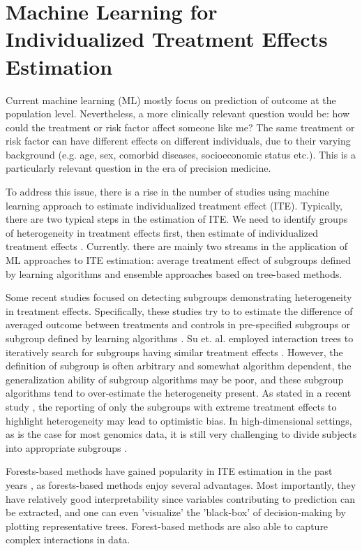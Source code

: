   \section{Machine Learning for Individualized Treatment Effects Estimation}
    Current machine learning (ML) mostly focus on prediction of outcome at the population level. Nevertheless, a more clinically relevant question would be: how could the treatment or risk factor affect someone like me? The same treatment or risk factor can have different effects on different individuals, due to their varying background (e.g. age, sex, comorbid diseases, socioeconomic status etc.). This is a particularly relevant question in the era of precision medicine. 
   
    To address this issue, there is  a rise in the number of studies using machine learning approach to estimate individualized treatment effect (ITE). Typically, there are two typical steps in the estimation of ITE. We need to identify groups of heterogeneity in treatment effects first, then estimate of individualized treatment effects \cite{scarpa2019assessment}. Currently. there are mainly two streams in the application of ML approaches to ITE estimation: average treatment effect of subgroups defined by learning algorithms and ensemble approaches based on tree-based methods.
    
    Some recent studies focused on detecting subgroups demonstrating heterogeneity in treatment effects. Specifically, these studies try to to estimate the difference of averaged outcome between treatments and controls in pre-specified subgroups \cite{gail1985testing} or subgroup defined by learning algorithms \cite{su2009subgroup, su2011interaction, athey2016recursive,foster2011subgroup, lipkovich2011subgroup}. Su et. al. employed interaction trees to iteratively search for subgroups having similar treatment effects \cite{su2009subgroup,su2011interaction}.  However, the definition of subgroup is often arbitrary and somewhat algorithm dependent, the generalization ability of subgroup algorithms may be poor, and these subgroup algorithms tend to over-estimate the heterogeneity present. As stated in a recent study \cite{wager2018estimation},  the reporting of only the subgroups with extreme treatment effects to highlight heterogeneity may lead to optimistic bias. In high-dimensional settings, as is the case for most genomics data, it is still very challenging to divide subjects into appropriate subgroups \cite{powers2017some}. 

    Forests-based methods have gained popularity in ITE estimation in the past years \cite{wager2018estimation,kunzel2019metalearners,lu2018estimating,dasgupta2014risk,hill2013assessing,hill2013assessing,green2012modeling}, as forests-based methods enjoy several advantages. Most importantly, they have relatively good interpretability since variables contributing to prediction can be extracted, and one can even 'visualize' the 'black-box' of decision-making by plotting representative trees. Forest-based methods are also able to capture complex interactions in data. 

